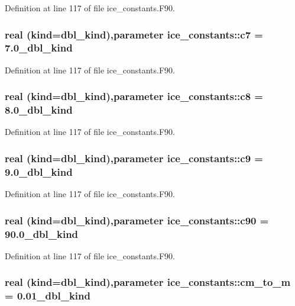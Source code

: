 Definition at line 117 of file ice\_\-constants.F90.\hypertarget{namespaceice__constants_a6f7e96de04b10ee2c94362546255969f}{
\subsubsection[{c7}]{\setlength{\rightskip}{0pt plus 5cm}real (kind=dbl\_\-kind),parameter {\bf ice\_\-constants::c7} = 7.0\_\-dbl\_\-kind}}
\label{namespaceice__constants_a6f7e96de04b10ee2c94362546255969f}


Definition at line 117 of file ice\_\-constants.F90.\hypertarget{namespaceice__constants_a16db17f9e3975da388c0c98f14393bc2}{
\subsubsection[{c8}]{\setlength{\rightskip}{0pt plus 5cm}real (kind=dbl\_\-kind),parameter {\bf ice\_\-constants::c8} = 8.0\_\-dbl\_\-kind}}
\label{namespaceice__constants_a16db17f9e3975da388c0c98f14393bc2}


Definition at line 117 of file ice\_\-constants.F90.\hypertarget{namespaceice__constants_a8fad19fc3e19d7387132c4b3184f62d8}{
\subsubsection[{c9}]{\setlength{\rightskip}{0pt plus 5cm}real (kind=dbl\_\-kind),parameter {\bf ice\_\-constants::c9} = 9.0\_\-dbl\_\-kind}}
\label{namespaceice__constants_a8fad19fc3e19d7387132c4b3184f62d8}


Definition at line 117 of file ice\_\-constants.F90.\hypertarget{namespaceice__constants_ab5bd5778b3d35bf4689b364fdb86f852}{
\subsubsection[{c90}]{\setlength{\rightskip}{0pt plus 5cm}real (kind=dbl\_\-kind),parameter {\bf ice\_\-constants::c90} = 90.0\_\-dbl\_\-kind}}
\label{namespaceice__constants_ab5bd5778b3d35bf4689b364fdb86f852}


Definition at line 117 of file ice\_\-constants.F90.\hypertarget{namespaceice__constants_ae6404df4cdf687bafaf228da3b7b4354}{
\subsubsection[{cm\_\-to\_\-m}]{\setlength{\rightskip}{0pt plus 5cm}real (kind=dbl\_\-kind),parameter {\bf ice\_\-constants::cm\_\-to\_\-m} = 0.01\_\-dbl\_\-kind}}
\label{namespaceice__constants_ae6404df4cdf687bafaf228da3b7b4354}


